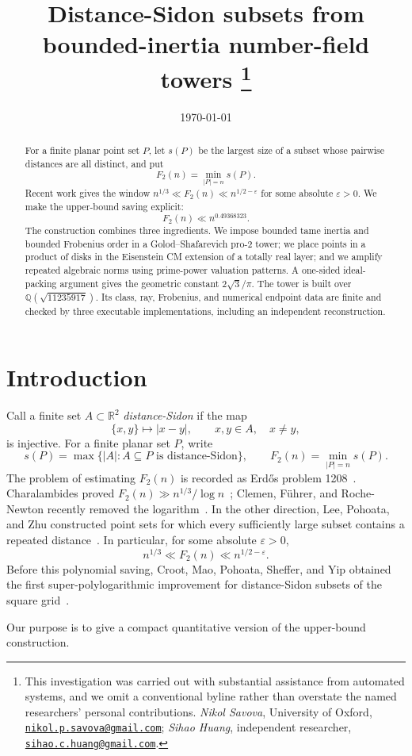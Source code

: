 \documentclass[11pt]{article}
\title{Distance-Sidon subsets from bounded-inertia number-field towers%
\thanks{This investigation was carried out with substantial
assistance from automated systems, and we omit a conventional byline rather
than overstate the named researchers' personal contributions.
\emph{Nikol Savova}, University of Oxford,
\href{mailto:nikol.p.savova@gmail.com}{\texttt{nikol.p.savova@gmail.com}};
\emph{Sihao Huang}, independent researcher,
\href{mailto:sihao.c.huang@gmail.com}{\texttt{sihao.c.huang@gmail.com}}.}}
\author{}
\date{\today}
\theoremstyle{definition}
\theoremstyle{remark}
\newcommand{\Q}{\mathbb Q}
\newcommand{\R}{\mathbb R}
\begin{document}
\maketitle

\begin{abstract}
For a finite planar point set $P$, let $s(P)$ be the largest size of a
subset whose pairwise distances are all distinct, and put
\[
 F_2(n)=\min_{|P|=n}s(P).
\]
Recent work gives the window
$n^{1/3}\ll F_2(n)\ll n^{1/2-\varepsilon}$ for some absolute
$\varepsilon>0$.  We make the upper-bound saving explicit:
\[
 \boxed{F_2(n)\ll n^{0.49368323}}.
\]
The construction combines three ingredients.  We impose bounded tame
inertia and bounded Frobenius order in a Golod--Shafarevich pro-$2$ tower;
we place points in a product of disks in the Eisenstein CM extension of a
totally real layer; and we amplify repeated algebraic norms using
prime-power valuation patterns.  A one-sided ideal-packing argument gives
the geometric constant $2\sqrt3/\pi$.  The tower is built over
$\Q(\sqrt{11235917})$.  Its class, ray, Frobenius, and numerical endpoint
data are finite and checked by three executable implementations, including
an independent reconstruction.
\end{abstract}

\section{Introduction}

Call a finite set $A\subset\R^2$ \emph{distance-Sidon} if the map
\[
 \{x,y\}\longmapsto |x-y|,
 \qquad x,y\in A,\quad x\ne y,
\]
is injective.  For a finite planar set $P$, write
\[
 s(P)=\max\{|A|:A\subseteq P\text{ is distance-Sidon}\},
 \qquad F_2(n)=\min_{|P|=n}s(P).
\]
The problem of estimating $F_2(n)$ is recorded as Erd\H{o}s problem
1208~\cite{ErdosProblems1208}.  Charalambides proved
$F_2(n)\gg n^{1/3}/\log n$~\cite{Charalambides2013}; Clemen, F\"uhrer,
and Roche-Newton recently removed the logarithm~\cite{ClemenEtAl2026}.
In the other direction, Lee, Pohoata, and Zhu constructed point sets for
which every sufficiently large subset contains a repeated
distance~\cite{LeePohoataZhu2026}.  In particular, for some absolute
$\varepsilon>0$,
\[
 n^{1/3}\ll F_2(n)\ll n^{1/2-\varepsilon}.       \tag{1.1}
\]
Before this polynomial saving, Croot, Mao, Pohoata, Sheffer, and Yip obtained
the first super-polylogarithmic improvement for distance-Sidon subsets of the
square grid~\cite{CrootEtAl2026}.

Our purpose is to give a compact quantitative version of the upper-bound
construction.
\end{document}
